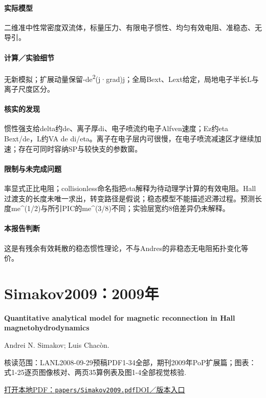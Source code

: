 \paragraph{实际模型}二维准中性常密度双流体，标量压力、有限电子惯性、均匀有效电阻、准稳态、无导引。

\paragraph{计算／实验细节}无新模拟；扩展动量保留-de\textsuperscript{2}(j·grad)j；全局Bext、Lext给定，局地电子半长L与离子尺度区分。

\paragraph{核实的发现}惯性强支给delta约de、离子厚di、电子喷流约电子Alfven速度；Ez约eta Bext/de，L约VA de di/eta。离子在电子层内可很慢，在电子喷流减速区才继续加速；存在可同时容纳SP与较快支的参数窗。

\paragraph{限制与未完成问题}率显式正比电阻；collisionless命名指把eta解释为待动理学计算的有效电阻。Hall过渡支的长度未唯一求出，转变路径是假说；稳态模型不能描述迟滞过程。预测长度me\textasciicircum{}(1/2)与所引PIC的me\textasciicircum{}(3/8)不同；实验层宽约8倍差异仍未解释。

\paragraph{本报告判断}这是有残余有效耗散的稳态惯性理论，不与Andres的非稳态无电阻拓扑变化等价。

\section{Simakov2009：2009年}\label{paper:Simakov2009}

\textbf{Quantitative analytical model for magnetic reconnection in Hall magnetohydrodynamics}\citep{Simakov2009}\

Andrei N. Simakov;  Luis Chacòn.

\textsf{核读范围：}LANL2008-09-29预稿PDF1-34全部，期刊2009年PoP扩展篇；\textsf{图表：}式1-25逐页图像核对、两页35算例表及图1-4全部视觉核验.

\href{run:papers/Simakov2009.pdf}{打开本地PDF：\texttt{papers/Simakov2009.pdf}}\quad\href{https://doi.org/10.1063/1.3077269}{DOI／版本入口}

